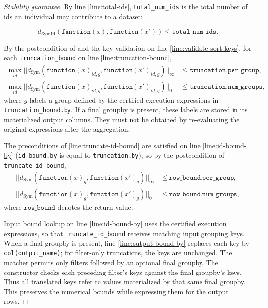 \documentclass{article}
\begin{document}
\begin{proof}[Stability guarantee]
    By line \ref{line:total-ids}, \texttt{total\_num\_ids} is the total number of ids an individual may contribute to a dataset:

    \begin{equation}
        d_{\mathrm{SymId}}(\texttt{function}(x), \texttt{function}(x')) \le \texttt{total\_num\_ids}.
    \end{equation}

    By the postcondition of 
    and the key validation on line \ref{line:validate-sort-keys},
    for each \texttt{truncation\_bound} on line \ref{line:truncation-bound},
    \begin{align*}
        \max_{id} ||d_{\mathrm{Sym}}(\texttt{function}(x)_{id,g}, \texttt{function}(x')_{id,g})||_\infty &\le \texttt{truncation.per\_group}, \\
        \max_{id} ||d_{\mathrm{Sym}}(\texttt{function}(x)_{id,g}, \texttt{function}(x')_{id,g})||_0 &\le \texttt{truncation.num\_groups},
    \end{align*}
    where $g$ labels a group defined by the certified execution expressions in \texttt{truncation\_bound.by}.
    If a final groupby is present, these labels are stored in its materialized output columns.
    They must not be obtained by re-evaluating the original expressions after the aggregation.

    The preconditions of \ref{line:truncate-id-bound} are satisfied on line \ref{line:id-bound-by}
    (\texttt{id\_bound.by} is equal to \texttt{truncation.by}),
    so by the postcondition of \texttt{truncate\_id\_bound},
    \begin{align*}
        ||d_{\mathrm{Sym}}(\texttt{function}(x)_{g}, \texttt{function}(x')_{g})||_\infty &\le \texttt{row\_bound.per\_group}, \\
        ||d_{\mathrm{Sym}}(\texttt{function}(x)_{g}, \texttt{function}(x')_{g})||_0 &\le \texttt{row\_bound.num\_groups},
    \end{align*}
    where $\texttt{row\_bound}$ denotes the return value.

    Input bound lookup on line \ref{line:id-bound-by} uses the certified execution expressions,
    so that \texttt{truncate\_id\_bound} receives matching input grouping keys.
    When a final groupby is present, line \ref{line:output-bound-by} replaces each key by \texttt{col(output\_name)};
    for filter-only truncations, the keys are unchanged.
    The matcher permits only filters followed by an optional final groupby.
    The constructor checks each preceding filter's keys against the final groupby's keys.
    Thus all translated keys refer to values materialized by that same final groupby.
    This preserves the numerical bounds while expressing them for the output rows.


\end{proof}
\end{document}
